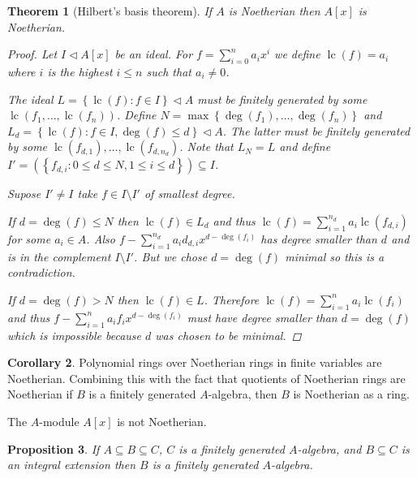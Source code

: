 \documentclass{article}
\newcommand{\set}[1]{\left\{#1\right\}}
\newcommand{\setwith}[2]{\left\{#1:#2\right\}}
\DeclareMathOperator{\lc}{lc}
\newcommand{\ideal}{\triangleleft}
\newtheorem{theorem}{Theorem}[section]
\newtheorem{proposition}[theorem]{Proposition}
\theoremstyle{definition}
\newtheorem{corollary}[theorem]{Corollary}
\begin{document}
\begin{theorem}[Hilbert's basis theorem]
    If \(A\) is Noetherian then \(A[x]\) is Noetherian.

    \begin{proof}
        Let \(I\ideal A[x]\) be an ideal. For \(f=\sum_{i=0}^{n}a_{i}x^{i}\) we
        define \(\lc(f)=a_{i}\) where \(i\) is the highest \(i\leq n\) such that
        \(a_{i}\neq 0\).

        The ideal \(L=\setwith{\lc(f)}{f\in I}\ideal A\) must be finitely
        generated by some \(\lc(f_{1},\ldots,\lc(f_{n}))\). Define
        \(N=\max\set{\deg(f_{1}),\ldots,\deg(f_{n})}\) and
        \(L_{d}=\set{\lc(f):f\in I,\deg(f)\leq d}\ideal A\). The latter must be
        finitely generated by some \(\lc(f_{d,1}),\ldots,\lc(f_{d,n_{d}})\).
        Note that \(L_{N}=L\) and define \(I'=(\setwith{f_{d,i}}{0\leq d\leq
            N,1\leq i\leq d})\subseteq I\).

        Supose \(I'\neq I\) take \(f\in I\setminus I'\) of smallest degree.

        If \(d=\deg(f)\leq N\) then \(\lc(f)\in L_{d}\) and thus
        \(\lc(f)=\sum_{i=1}^{n_{d}}a_{i}\lc(f_{d,i})\) for some \(a_{i}\in A\).
        Also \(f-\sum_{i=1}^{n_{d}}a_{i}d_{d,i}x^{d-\deg(f_{i})}\) has degree
        smaller than \(d\) and is in the complement \(I\setminus I'\). But we
        chose \(d=\deg(f)\) minimal so this is a contradiction.

        If \(d=\deg(f)>N\) then \(\lc(f)\in L\). Therefore
        \(\lc(f)=\sum_{i=1}^{n}a_{i}\lc(f_{i})\) and thus
        \(f-\sum_{i=1}^{n}a_{i}f_{i}x^{d-\deg(f_{i})}\) must have degree smaller
        than \(d=\deg(f)\) which is impossible because \(d\) was chosen to be
        minimal.
    \end{proof}
\end{theorem}

\begin{corollary}
    Polynomial rings over Noetherian rings in finite variables are Noetherian.
    Combining this with the fact that quotients of Noetherian rings are
    Noetherian if \(B\) is a finitely generated \(A\)-algebra, then \(B\) is
    Noetherian as a ring.

    The \(A\)-module \(A[x]\) is not Noetherian.
\end{corollary}

\begin{proposition}
    If \(A\subseteq B\subseteq C\), \(C\) is a finitely generated \(A\)-algebra,
    and \(B\subseteq C\) is an integral extension then \(B\) is a finitely
    generated \(A\)-algebra.
\end{proposition}
\end{document}

